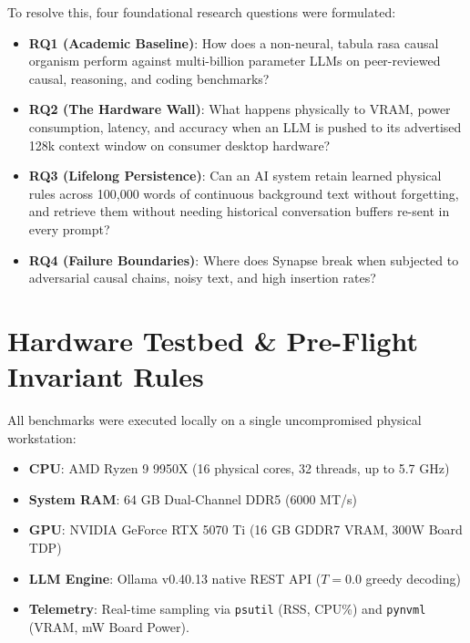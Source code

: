 \documentclass[11pt,a4paper]{article}
\begin{document}
To resolve this, four foundational research questions were formulated:
\begin{itemize}[leftmargin=1.5em, itemsep=1pt, topsep=1pt]
  \item \textbf{RQ1 (Academic Baseline)}: How does a non-neural, tabula rasa causal organism perform against multi-billion parameter LLMs on peer-reviewed causal, reasoning, and coding benchmarks?
  \item \textbf{RQ2 (The Hardware Wall)}: What happens physically to VRAM, power consumption, latency, and accuracy when an LLM is pushed to its advertised 128k context window on consumer desktop hardware?
  \item \textbf{RQ3 (Lifelong Persistence)}: Can an AI system retain learned physical rules across 100,000 words of continuous background text without forgetting, and retrieve them without needing historical conversation buffers re-sent in every prompt?
  \item \textbf{RQ4 (Failure Boundaries)}: Where does Synapse break when subjected to adversarial causal chains, noisy text, and high insertion rates?
\end{itemize}

\vspace{0.8em}

\section{Hardware Testbed \& Pre-Flight Invariant Rules}
All benchmarks were executed locally on a single uncompromised physical workstation:
\begin{itemize}[leftmargin=1.5em, itemsep=1pt, topsep=1pt]
  \item \textbf{CPU}: AMD Ryzen 9 9950X (16 physical cores, 32 threads, up to 5.7 GHz)
  \item \textbf{System RAM}: 64 GB Dual-Channel DDR5 (6000 MT/s)
  \item \textbf{GPU}: NVIDIA GeForce RTX 5070 Ti (16 GB GDDR7 VRAM, 300W Board TDP)
  \item \textbf{LLM Engine}: Ollama v0.40.13 native REST API ($T=0.0$ greedy decoding)
  \item \textbf{Telemetry}: Real-time sampling via \texttt{psutil} (RSS, CPU\%) and \texttt{pynvml} (VRAM, mW Board Power).
\end{itemize}
\end{document}
